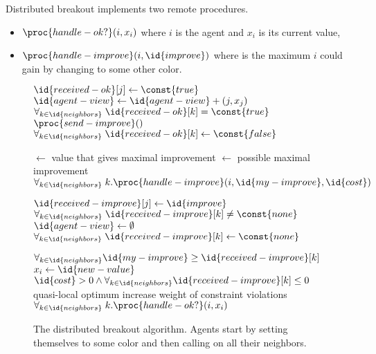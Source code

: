Distributed breakout implements two remote procedures.

\begin{itemize}
\item $\proc{handle-ok?}(i,x_i)$ where $i$ is the agent and $x_i$
  is its current value,
\item $\proc{handle-improve}(i, \id{improve})$ where
   is the maximum $i$ could gain by changing to some other
  color.
\end{itemize}

\begin{SCfigure}
  \begin{minipage}{1.0\linewidth}
  \begin{codebox}
    \li $\id{received-ok}[j] \gets \const{true}$
    \li $\id{agent-view} \gets \id{agent-view} + (j, x_j)$
    \li \If $\forall_{k \in \id{neighbors}} \; \id{received-ok}[k] = \const{true}$
    \li \Then $\proc{send-improve}()$
    \li       $\forall_{k \in \id{neighbors}} \; \id{received-ok}[k]
    \gets \const{false}$
    \End
  \end{codebox}

  \begin{codebox}
    \li {} $\gets$ value that gives maximal improvement
    \li {} $\gets$ possible maximal improvement
    \li $\forall_{k \in \id{neighbors}}\; k.\proc{handle-improve}(i, \id{my-improve}, \id{cost})$
  \end{codebox}

  \begin{codebox}
    \li $\id{received-improve}[j] \gets \id{improve}$
    \li \If $\forall_{k \in \id{neighbors}} \; \id{received-improve}[k] \neq \const{none}$
    \li \Then {}
    \li      $\id{agent-view} \gets \emptyset$
    \li       $\forall_{k \in \id{neighbors}} \; \id{received-improve}[k]
    \gets \const{none}$
    \End
  \end{codebox}

  \begin{codebox}
    \li \If $\forall_{k \in \id{neighbors}} \id{my-improve} \geq \id{received-improve}[k]$
    \li \Then $x_i \gets \id{new-value}$
        \End
    \li \If $\id{cost} > 0 \wedge \forall_{k \in \id{neighbors}}
    \id{received-improve}[k] \leq 0$ \Comment quasi-local optimum
    \li \Then increase weight of constraint violations
        \End
    \li $\forall_{k \in \id{neighbors}}\; k.\proc{handle-ok?}(i,
    x_i)$
  \end{codebox}
    
  \end{minipage}

  \caption{The distributed breakout algorithm. Agents start by setting
    themselves to some color and then calling  on all
    their neighbors.}
  \label{fig:dbreakout}
\end{SCfigure}


